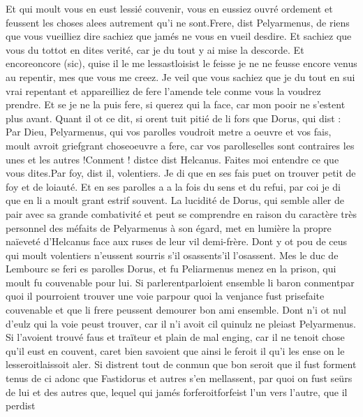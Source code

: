 \documentclass{article}
\begin{document}
\begin{pages}
   Et qui moult vous en eust lessié couvenir, vous en eussiez ouvré ordement 
      et feussent les choses alees autrement qu’i ne sont.Frere, dist Pelyarmenus, de riens que vous vueilliez dire sachiez
      que jamés ne vous en vueil desdire. Et sachiez que vous du tottot en 
      dites verité, car je du tout y ai mise la descorde. 
      Et encoreoncore (sic), 
      quise il 
      le me lessastloisist 
      le feisse je ne ne feusse encore venus au repentir, mes que vous me creez. 
   Je veil que vous sachiez que je du tout en sui vrai repentant et appareilliez de fere l’amende tele conme vous la voudrez prendre. 
   Et se je ne la puis fere, si querez qui la face, car mon pooir ne s’estent plus avant. \pend
\pstart Quant il ot ce dit, si orent tuit pitié de li fors 
   que Dorus, qui dist :
   Par Dieu, Pelyarmenus, qui vos parolles voudroit metre a oeuvre 
      et vos fais, moult avroit 
      griefgrant 
      choseoeuvre 
      a fere, 
      car vos parolleselles sont contraires les unes et les autres !Conment ! distce dist Helcanus. 
      Faites moi entendre ce que vous dites.Par foy, dist il, volentiers. Je di que en ses fais puet on trouver petit de foy et de loiauté. 
   Et en ses parolles a a la fois du sens et du refui, par coi je di que en li a moult grant estrif souvent.
   La lucidité de Dorus, qui semble aller de pair avec sa grande combativité et peut se comprendre 
   en raison du caractère très personnel des méfaits de Pelyarmenus à son égard, met en lumière la propre naïeveté d'Helcanus face 
   aux ruses de leur vil demi-frère.
   Dont y ot pou de ceus qui moult volentiers n’eussent sourris 
   s'il osassents'il l'osassent. 
   Mes le duc de Lembourc se feri es parolles 
   Dorus, et fu Peliarmenus menez en la prison, 
   qui moult fu couvenable pour lui. Si parlerentparloient ensemble li baron 
   conmentpar quoi il pourroient trouver une voie 
      parpour 
      quoi la venjance fust prisefaite couvenable et 
   que li frere peussent demourer bon ami ensemble. Dont n’i ot nul d’eulz qui la voie peust trouver, 
   car il n’i avoit cil quinulz ne pleiast
   Pelyarmenus. 
   Si l’avoient trouvé faus et traïteur et plain de mal enging, car il ne tenoit chose qu’il eust en couvent, 
   caret bien savoient que ainsi 
   le feroit il 
   qu’i les ense on le 
   lesseroitlaissoit aler. Si distrent tout de conmun que 
   bon seroit que il fust forment 
      tenus de ci adonc que Fastidorus et autres s’en mellassent, par quoi on fust seürs de lui 
      et des autres que, lequel qui jamés forferoitforfeist 
      l’un vers l’autre, que il perdist 

\end{pages}
\end{document}
